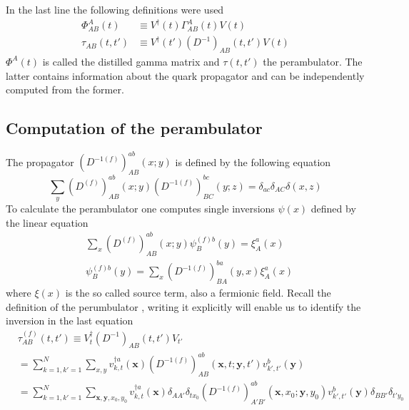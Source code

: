     In the last line the following definitions were used
    \begin{equation}
        \begin{aligned}\label{def_gamma_and_perambulator}
            \Phi_{AB}^A(t) &\equiv V^\dagger(t)\Gamma_{AB}^A(t)V(t)\\
            \tau_{AB}(t,t') &\equiv V^\dagger(t')(D^{-1})_{AB}(t,t')V(t)
        \end{aligned}
    \end{equation}
    $\Phi^A(t)$ is called the distilled gamma matrix and $\tau(t,t')$ the perambulator. The latter contains information about the quark propagator and can be independently computed from the former.
    
\subsection{Computation of the perambulator}
    The propagator $(D^{-1(f)})^{ab}_{AB}(x;y)$ is defined by the following equation \cite{four_quark_correlation_functions}
    \begin{equation}
        \sum_{y}(D^{(f)})^{ab}_{AB}(x;y)(D^{-1(f)})^{bc}_{BC}(y;z) = \delta_{ac}\delta_{AC}\delta(x,z)
    \end{equation}
    To calculate the perambulator one computes single inversions $\psi(x)$ defined by the linear equation
    \begin{equation}
        \begin{aligned}\label{inversion_term}
            &\sum_{x}(D^{(f)})^{ab}_{AB}(x;y)\psi^{(f)b}_{B}(y) = \xi^a_A(x)\\
            &\psi^{(f)b}_{B}(y) = \sum_{x}(D^{-1(f)})^{ba}_{BA}(y,x)\xi^a_A(x)
        \end{aligned}
    \end{equation}
    where $\xi(x)$ is the so called source term, also a fermionic field. Recall the definition of the perumbulator , writing it explicitly will enable us to identify the inversion in the last equation \cite{bachelor_thesis_jan}
    \begin{equation}\label{perambulator_explicit}
        \begin{aligned}
            &\tau^{(f)}_{AB}(t,t') \equiv V^\dagger_t(D^{-1})_{AB}(t,t')V_{t'}\\
            &= \sum_{k=1,k'=1}^N \sum_{x,y}
            v_{k,t}^{\dagger a}(\textbf{x}) 
            (D^{-1(f)})^{ab}_{AB}(\textbf{x},t;\textbf{y},t')
            v_{k',t'}^{b}(\textbf{y})\\
            &= \sum_{k=1,k'=1}^N \sum_{\textbf{x},\textbf{y},x_0,y_0}
            v_{k,t}^{\dagger a}(\textbf{x})\delta_{AA'}\delta_{tx_0}
            (D^{-1(f)})^{ab}_{A'B'}(\textbf{x},x_0;\textbf{y},y_0)
            v_{k',t'}^{b}(\textbf{y})\delta_{BB'}\delta_{t'y_0}
        \end{aligned}
    \end{equation}
